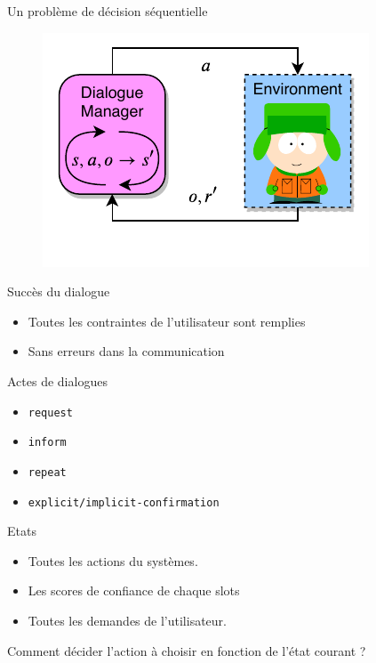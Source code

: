 \documentclass[french,handout]{beamer}
\begin{document}
    \begin{frame}{Un problème de décision séquentielle}
        \begin{figure}
            \centering
            \includegraphics[scale=1.0,page=1]{../sources/dm-rl/rl-pipeline}
        \end{figure}
    \end{frame}
    \begin{frame}
        \begin{block}{Succès du dialogue}
            \begin{itemize}
                \item Toutes les contraintes de l'utilisateur sont remplies
                \item Sans erreurs dans la communication
            \end{itemize}
        \end{block}

        \begin{block}{Actes de dialogues}
            \begin{itemize}
            \item \texttt{request}
            \item \texttt{inform}
            \item \texttt{repeat}
            \item \texttt{explicit/implicit-confirmation}
            \end{itemize}
        \end{block}

        \begin{block}{Etats}
            \begin{itemize}
                \item Toutes les actions du systèmes.
                \item Les scores de confiance de chaque slots
                \item Toutes les demandes de l'utilisateur.
            \end{itemize}
        \end{block}

        \begin{alertblock}{}
            Comment décider l'action à choisir en fonction de l'état courant ?
        \end{alertblock}
    \end{frame}
\end{document}
